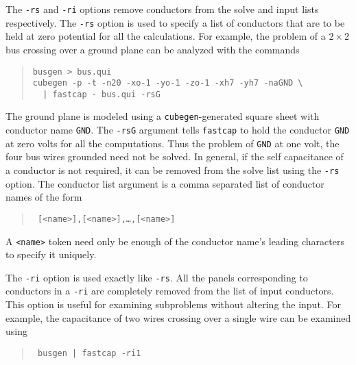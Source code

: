The {\tt -rs} and {\tt -ri} options remove conductors from the solve
and input lists respectively.
The {\tt -rs} option is used to specify a list of conductors that are
to be held at zero potential for all the calculations. For example,
the problem of a $2\times 2$ bus crossing over a ground plane can
be analyzed with the commands
\begin{quote}
\begin{verbatim}
busgen > bus.qui
cubegen -p -t -n20 -xo-1 -yo-1 -zo-1 -xh7 -yh7 -naGND \
  | fastcap - bus.qui -rsG
\end{verbatim}
\end{quote}
The ground plane is modeled using a {\tt cubegen}-generated square sheet 
with conductor name {\tt GND}. The {\tt -rsG} argument tells {\tt fastcap}
to hold the conductor {\tt GND} at zero volts for all the computations.
Thus the problem of {\tt GND} at one volt, the four bus wires grounded
need not be solved. In general, if the self capacitance of a conductor
is not required, it can be removed from the solve list using
the {\tt -rs} option. The conductor list argument {\tt <cond list>} is
a comma separated list of conductor names of the form
\begin{quote}\tt
[<name>],[<name>],\ldots,[<name>]
\end{quote}
A {\tt <name>} token need only be enough of the conductor name's leading
characters to specify it uniquely.

The {\tt -ri} option is used exactly like {\tt -rs}. All the panels
corresponding to conductors in
a {\tt -ri} {\tt <cond list>} are completely removed from the list
of input conductors. This option is useful for examining subproblems
without altering the input. For example, the capacitance of two wires
crossing over a single wire can be examined using
\begin{quote}\tt
busgen | fastcap -ri1
\end{quote}



